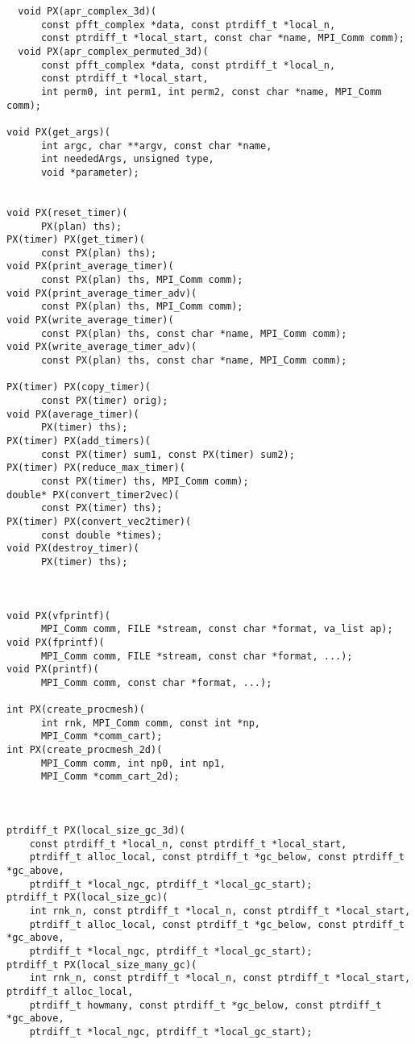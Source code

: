 \begin{lstlisting}
  void PX(apr_complex_3d)(
      const pfft_complex *data, const ptrdiff_t *local_n,
      const ptrdiff_t *local_start, const char *name, MPI_Comm comm);
  void PX(apr_complex_permuted_3d)(
      const pfft_complex *data, const ptrdiff_t *local_n,
      const ptrdiff_t *local_start,
      int perm0, int perm1, int perm2, const char *name, MPI_Comm comm);

void PX(get_args)(
      int argc, char **argv, const char *name,
      int neededArgs, unsigned type,
      void *parameter);


void PX(reset_timer)(
      PX(plan) ths);
PX(timer) PX(get_timer)(
      const PX(plan) ths);
void PX(print_average_timer)(
      const PX(plan) ths, MPI_Comm comm);
void PX(print_average_timer_adv)(
      const PX(plan) ths, MPI_Comm comm);
void PX(write_average_timer)(
      const PX(plan) ths, const char *name, MPI_Comm comm);
void PX(write_average_timer_adv)(
      const PX(plan) ths, const char *name, MPI_Comm comm);

PX(timer) PX(copy_timer)(
      const PX(timer) orig);
void PX(average_timer)(
      PX(timer) ths);
PX(timer) PX(add_timers)(
      const PX(timer) sum1, const PX(timer) sum2);
PX(timer) PX(reduce_max_timer)(
      const PX(timer) ths, MPI_Comm comm);
double* PX(convert_timer2vec)(
      const PX(timer) ths);
PX(timer) PX(convert_vec2timer)(
      const double *times);
void PX(destroy_timer)(
      PX(timer) ths);



void PX(vfprintf)(
      MPI_Comm comm, FILE *stream, const char *format, va_list ap);
void PX(fprintf)(
      MPI_Comm comm, FILE *stream, const char *format, ...);
void PX(printf)(
      MPI_Comm comm, const char *format, ...);

int PX(create_procmesh)(
      int rnk, MPI_Comm comm, const int *np,
      MPI_Comm *comm_cart);
int PX(create_procmesh_2d)(
      MPI_Comm comm, int np0, int np1,
      MPI_Comm *comm_cart_2d);



ptrdiff_t PX(local_size_gc_3d)(
    const ptrdiff_t *local_n, const ptrdiff_t *local_start,
    ptrdiff_t alloc_local, const ptrdiff_t *gc_below, const ptrdiff_t *gc_above,
    ptrdiff_t *local_ngc, ptrdiff_t *local_gc_start);
ptrdiff_t PX(local_size_gc)(
    int rnk_n, const ptrdiff_t *local_n, const ptrdiff_t *local_start,
    ptrdiff_t alloc_local, const ptrdiff_t *gc_below, const ptrdiff_t *gc_above,
    ptrdiff_t *local_ngc, ptrdiff_t *local_gc_start);
ptrdiff_t PX(local_size_many_gc)(
    int rnk_n, const ptrdiff_t *local_n, const ptrdiff_t *local_start, ptrdiff_t alloc_local,
    ptrdiff_t howmany, const ptrdiff_t *gc_below, const ptrdiff_t *gc_above,
    ptrdiff_t *local_ngc, ptrdiff_t *local_gc_start);


\end{lstlisting}
